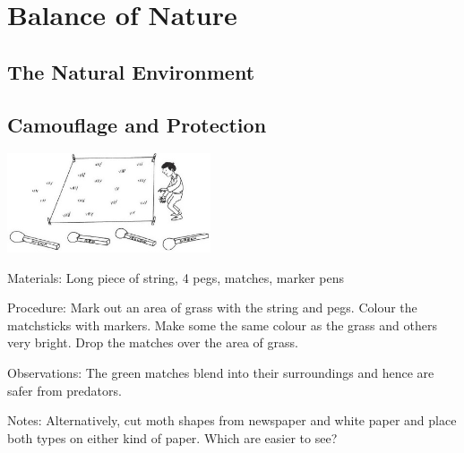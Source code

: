 \section{Balance of Nature} 

\begin{multicols}{2}



\section*{The Natural Environment}


\subsection{Camouflage and Protection}  %

\begin{center}
\includegraphics[width=0.45\textwidth]{./img/vso/camouflage-protection.jpg}
\end{center}

\begin{description*}
\item[Materials:]{Long piece of string, 4 pegs, matches, marker pens}
\item[Procedure:]{Mark out an area of grass with
the string and pegs. Colour the
matchsticks with markers. Make some the same
colour as the grass and others
very bright. Drop the
matches over the area of grass.
}
\item[Observations:]{The green matches blend into their surroundings and hence are safer from predators.}
\item[Notes:]{Alternatively, cut moth shapes from newspaper
and white paper and place both types on either kind of paper. Which are easier to see?}
\end{description*}


\end{multicols}
